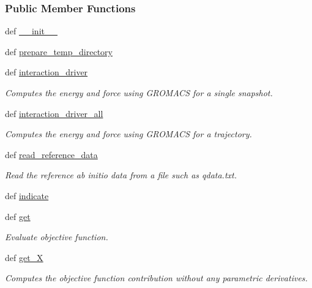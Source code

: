 \subsubsection*{Public Member Functions}
\begin{DoxyCompactItemize}
\item 
def \hyperlink{classforcebalance_1_1gmxio_1_1Interaction__GMX_a325cf41b32aa979201a35329f7c9d546}{\-\_\-\-\_\-init\-\_\-\-\_\-}
\item 
def \hyperlink{classforcebalance_1_1gmxio_1_1Interaction__GMX_a2dee88df57edbb437dbf69678038dd17}{prepare\-\_\-temp\-\_\-directory}
\item 
def \hyperlink{classforcebalance_1_1gmxio_1_1Interaction__GMX_a8ce5c501d7ca8ae08ee2f5c21a67e0fc}{interaction\-\_\-driver}
\begin{DoxyCompactList}\small\item\em Computes the energy and force using G\-R\-O\-M\-A\-C\-S for a single snapshot. \end{DoxyCompactList}\item 
def \hyperlink{classforcebalance_1_1gmxio_1_1Interaction__GMX_a5bac92638e1962f1ccbe189f4e20898b}{interaction\-\_\-driver\-\_\-all}
\begin{DoxyCompactList}\small\item\em Computes the energy and force using G\-R\-O\-M\-A\-C\-S for a trajectory. \end{DoxyCompactList}\item 
def \hyperlink{classforcebalance_1_1interaction_1_1Interaction_aa67c082c3b6fa2d87ba3f4cf1a74e4f8}{read\-\_\-reference\-\_\-data}
\begin{DoxyCompactList}\small\item\em Read the reference ab initio data from a file such as qdata.\-txt. \end{DoxyCompactList}\item 
def \hyperlink{classforcebalance_1_1interaction_1_1Interaction_a91f94b978b73dd886035dcdb96b53cc1}{indicate}
\item 
def \hyperlink{classforcebalance_1_1interaction_1_1Interaction_a9fc3a40eb2852241ea440af719f6cf29}{get}
\begin{DoxyCompactList}\small\item\em Evaluate objective function. \end{DoxyCompactList}\item 
def \hyperlink{classforcebalance_1_1target_1_1Target_a606dd136f195c267c05a2455405e5949}{get\-\_\-\-X}
\begin{DoxyCompactList}\small\item\em Computes the objective function contribution without any parametric derivatives. \end{DoxyCompactList}\item 

\end{DoxyCompactItemize}
